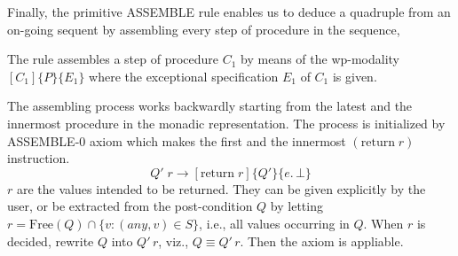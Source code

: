 Finally, the primitive ASSEMBLE rule enables us to deduce a quadruple  from an on-going sequent by
assembling every step of procedure in the sequence,

\begin{prooftree}
\end{prooftree}

The rule assembles a step of procedure $C_1$ by means of the wp-modality $[C_1]\{P\}\{E_1\}$
where the exceptional specification $E_1$ of $C_1$ is given.

The assembling process works backwardly starting from the latest and the innermost procedure in the monadic representation.
The process is initialized by ASSEMBLE-0 axiom which makes the first and the innermost $(\mathrm{return}\;r)$ instruction.
\[ Q'\;r \longrightarrow [\mathrm{return}\;r]\{Q'\}\{e.\, ⊥\} \tag{ASSEMBLE-0}\label{ax:ASSEMBLE-0} \]
$r$ are the values intended to be returned.
They can be given explicitly by the user, or be extracted from the post-condition $Q$ by letting
$r = \mathrm{Free}(Q) \cap \{ v : (any,v) ∈ S\}$, i.e., all values occurring in $Q$.
When $r$ is decided, rewrite $Q$ into $Q'\,r$, viz., $Q \equiv Q'\,r$. Then the axiom is appliable.
